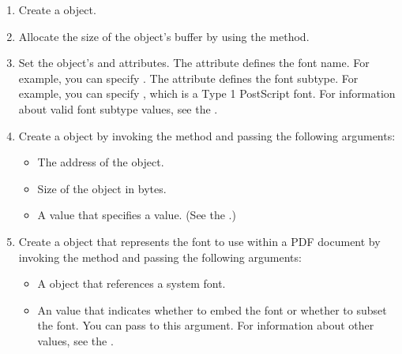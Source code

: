 \documentclass[letterpaper,12pt,english,openany,oneside]{sphinxmanual}
\begin{document}
\begin{enumerate}
%
\item {} 
Create a  object.

\item {} 
Allocate the size of the  object’s buffer by using the  method.

\item {} 
Set the  object’s  and  attributes. The  attribute defines the font name. For example, you can specify . The  attribute defines the font subtype. For example, you can specify , which is a Type 1 PostScript font. For information about valid font subtype values, see the .

\item {} 
Create a  object by invoking the  method and passing the following arguments:
\begin{itemize}
\item {} 
The address of the  object.

\item {} 
Size of the  object in bytes.

\item {} 
A value that specifies a  value. (See the .)

\end{itemize}

\item {} 
Create a  object that represents the font to use within a PDF document by invoking the  method and passing the following arguments:
\begin{itemize}
\item {} 
A  object that references a system font.

\item {} 
An  value that indicates whether to embed the font or whether to subset the font. You can pass  to this argument. For information about other values, see the .

\end{itemize}

\end{enumerate}
\end{document}
